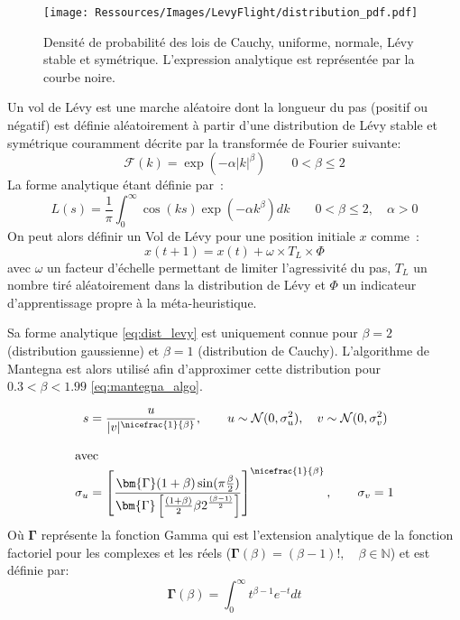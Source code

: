 \begin{figure}
    \begin{center}
        \texttt{[image: Ressources/Images/LevyFlight/distribution\_pdf.pdf]}
    \end{center}
    \caption{Densité de probabilité des lois de Cauchy, uniforme, normale, Lévy stable et symétrique.
             L’expression analytique est représentée par la courbe noire.
             \label{fig:distribution_pdf}}
\end{figure}

\begin{Def}\label{def:vol_levy}
Un vol de Lévy est une marche aléatoire dont la longueur du pas (positif ou négatif)
est définie aléatoirement à partir d’une distribution de Lévy stable et symétrique
couramment décrite par la transformée de Fourier suivante:
\begin{equation}\label{eq:fourier_levy}
    \mathcal{F}(k) = \exp(-\alpha\mathopen{|}k\mathclose{|}^{\beta}) \qquad  0 < \beta \leq 2
\end{equation}
La forme analytique étant définie par~:
\begin{equation}\label{eq:dist_levy}
    L(s) = \frac{1}{\pi} \int_{0}^{\infty} \cos(k s)\exp(-\alpha k^{\beta}) dk \qquad  0 < \beta \leq 2,
           \quad \alpha > 0
\end{equation}
On peut alors définir un Vol de Lévy pour une position initiale $x$ comme~:
\begin{equation}
  x(t + 1) = x(t) + \omega \times T_{L} \times \Phi
\end{equation}
avec $\omega$ un facteur d’échelle permettant de limiter l’agressivité du pas,
$T_{L}$ un nombre tiré aléatoirement dans la distribution de Lévy et $\Phi$
un indicateur d’apprentissage propre à la méta-heuristique.
\end{Def}

Sa forme analytique \eqref{eq:dist_levy} est uniquement connue pour $\beta = 2$
(distribution gaussienne) et $\beta = 1$ (distribution de Cauchy).
L’algorithme de Mantegna \parencite{Mantegna19944677} est alors utilisé afin
d’approximer cette distribution pour $0.3 < \beta < 1.99$ \eqref{eq:mantegna_algo}.

\begin{align}\label{eq:mantegna_algo}
    s &= \frac{u}{\mathopen{|}v\mathclose{|}^{\nicefrac{1}{\beta}}}, \qquad u \sim \mathcal{N}(0, \sigma_{u}^{2}),
        \quad v \sim \mathcal{N}(0, \sigma_{v}^{2}) \\[1em]
    \shortintertext{avec}
    \sigma_{u} &= \left[ \frac{\bm{{\Gamma}}(1+\beta)\sin(\pi\frac{\beta}{2})}%
                             {\bm{{\Gamma}} \left[\frac{(1+\beta)}{2}\beta
                              2^{\frac{(\beta-1)}{2}}\right]}\right]^{\nicefrac{1}{\beta}},%
    \qquad \sigma_{v} = 1 \notag
\end{align}
Où $\bm{{\Gamma}}$ représente la fonction Gamma qui est l’extension analytique de la
fonction factoriel pour les complexes et les réels ($\bm{{\Gamma}}(\beta) = (\beta -1)!,\quad \beta\in \mathbb{N}$)
et est définie par:
\begin{equation*}
  \bm{{\Gamma}}(\beta) = \int_{0}^{\infty} t^{\beta-1}e^{-t} dt
\end{equation*}


